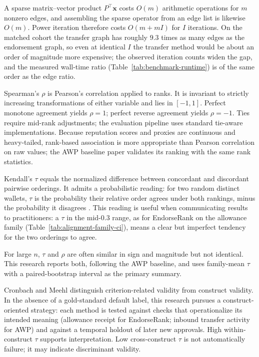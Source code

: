 A sparse matrix--vector product $P^{\top}\mathbf{x}$ costs $O(m)$ arithmetic operations for $m$ nonzero edges, and assembling the sparse operator from an edge list is likewise $O(m)$. Power iteration therefore costs $O(m + mI)$ for $I$ iterations. On the matched cohort the transfer graph has roughly $9.3$ times as many edges as the endorsement graph, so even at identical $I$ the transfer method would be about an order of magnitude more expensive; the observed iteration counts widen the gap, and the measured wall-time ratio (Table~\ref{tab:benchmark-runtime}) is of the same order as the edge ratio.


Spearman's $\rho$ is Pearson's correlation applied to ranks. It is invariant to strictly increasing transformations of either variable and lies in $[-1,1]$. Perfect monotone agreement yields $\rho=1$; perfect reverse agreement yields $\rho=-1$. Ties require mid-rank adjustments; the evaluation pipeline uses standard tie-aware implementations. Because reputation scores and proxies are continuous and heavy-tailed, rank-based association is more appropriate than Pearson correlation on raw values; the AWP baseline paper validates its ranking with the same rank statistics.


Kendall's $\tau$ equals the normalized difference between concordant and discordant pairwise orderings. It admits a probabilistic reading: for two random distinct wallets, $\tau$ is the probability their relative order agrees under both rankings, minus the probability it disagrees . This reading is useful when communicating results to practitioners: a $\tau$ in the mid-$0.3$ range, as for EndorseRank on the allowance family (Table~\ref{tab:alignment-family-ci}), means a clear but imperfect tendency for the two orderings to agree.

For large $n$, $\tau$ and $\rho$ are often similar in sign and magnitude but not identical. This research reports both, following the AWP baseline, and uses family-mean $\tau$ with a paired-bootstrap interval  as the primary summary.


Cronbach and Meehl distinguish criterion-related validity from construct validity. In the absence of a gold-standard default label, this research pursues a construct-oriented strategy: each method is tested against checks that operationalize its intended meaning (allowance receipt for EndorseRank; inbound transfer activity for AWP) and against a temporal holdout of later new approvals. High within-construct $\tau$ supports interpretation. Low cross-construct $\tau$ is not automatically failure; it may indicate discriminant validity.


